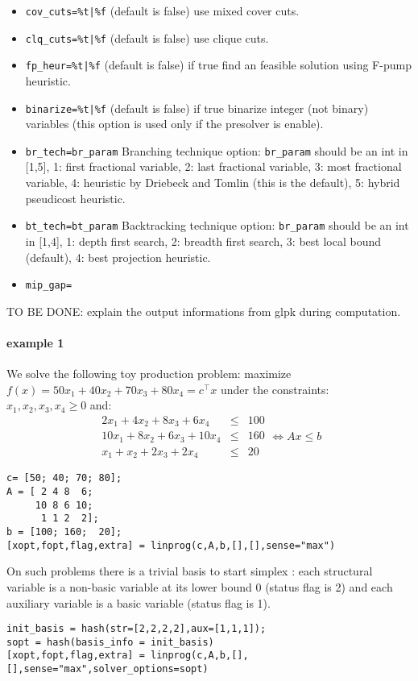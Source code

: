 \begin{mandescription}
\begin{description}
\begin{itemize}
\item \verb+cov_cuts=%t|%f+ (default is false) use mixed cover cuts.
\item \verb+clq_cuts=%t|%f+ (default is false) use clique cuts.
\item \verb+fp_heur=%t|%f+ (default is false) if true find an feasible solution using F-pump heuristic.
\item \verb+binarize=%t|%f+ (default is false) if true binarize integer (not binary) variables (this 
      option is used only if the presolver is enable).
\item \verb+br_tech=br_param+ Branching technique option: \verb+br_param+ should be an int in [1,5],
      1: first fractional variable, 2: last fractional variable, 3: most fractional variable, 4:
      heuristic by Driebeck and Tomlin (this is the default), 5: hybrid pseudicost heuristic.
\item \verb+bt_tech=bt_param+ Backtracking technique option:  \verb+br_param+ should be an int in [1,4],
      1: depth first search, 2: breadth first search, 3: best local bound (default), 4: best projection heuristic.
\item \verb+mip_gap=+
\end{itemize}
\end{description}


TO BE DONE: explain the output informations from glpk during computation. 

\end{mandescription} 

\begin{examples}
\paragraph{example 1} We solve the following toy production problem: maximize
$f(x) = 50 x_1 + 40 x_2 + 70 x_3 + 80 x_4 = c^{\top} x$ under the constraints:
$x_1, x_2, x_3, x_4 \ge  0$ and:
$$
\begin{array}{rcl}
   2 x_1 + 4 x_2 +  8 x_3 +  6 x_4 & \le & 100\\
   10 x_1 + 8 x_2 + 6 x_3 + 10 x_4 & \le & 160\\
      x_1 +  x_2  + 2 x_3 +  2 x_4 & \le & 20
\end{array} \iff  A x \le b
$$
\begin{Verbatim}
c= [50; 40; 70; 80];
A = [ 2 4 8  6;
     10 8 6 10;
      1 1 2  2];
b = [100; 160;  20];
[xopt,fopt,flag,extra] = linprog(c,A,b,[],[],sense="max")
\end{Verbatim}
On such problems there is a trivial basis to start simplex : each structural variable
is a non-basic variable at its lower bound 0 (status flag is 2) and each auxiliary variable 
is a basic variable (status flag is 1). 
\begin{Verbatim}
init_basis = hash(str=[2,2,2,2],aux=[1,1,1]);
sopt = hash(basis_info = init_basis)
[xopt,fopt,flag,extra] = linprog(c,A,b,[],[],sense="max",solver_options=sopt)
\end{Verbatim}


\end{examples}

